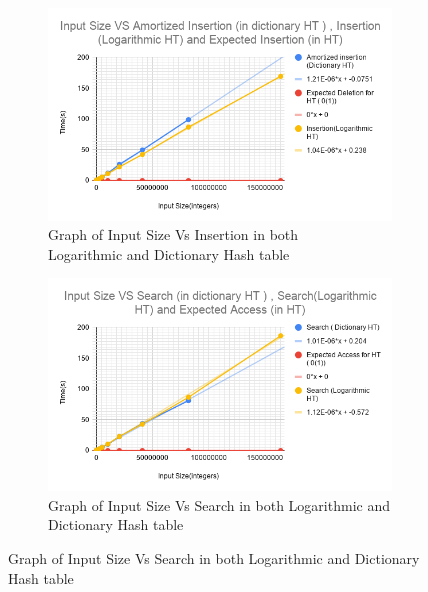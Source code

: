 \documentclass[a4paper,12pt, openany]{book}
\begin{document}
\begin{figure}
	\centering
	\begin{subfigure}{.55\textwidth}
		\centering
		\includegraphics[height=\textwidth, width=\linewidth]{Insertion.png}
		\caption{Graph of Input Size Vs Insertion in both \\  Logarithmic and Dictionary Hash table}
		\label{fig:sub1}
	\end{subfigure}%
	\begin{subfigure}{.55\textwidth}
		\centering
		\includegraphics[height=\textwidth, width=\linewidth]{Search.png}
		\caption{Graph of Input Size Vs Search in both Logarithmic and Dictionary Hash table}
		\label{fig:sub2}
	\end{subfigure}
	\label{fig:test}
\end{figure}
\end{document}
